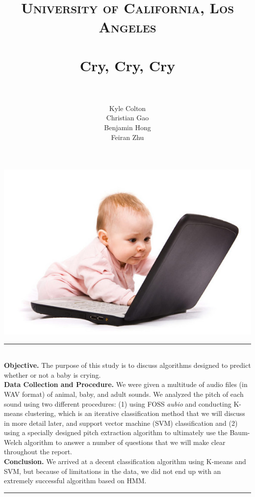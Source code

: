 \documentclass[paper=a4, fontsize=11pt]{scrartcl}
\title{
		\usefont{OT1}{bch}{b}{n}
		\normalfont \normalsize \textsc{University of California, Los Angeles} \\ [25pt]
		\horrule{0.5pt} \\[0.4cm]
		\huge Cry, Cry, Cry \\
		\horrule{2pt} \\[0.5cm]
}
\author{
		\normalfont \normalsize Kyle Colton \\
        \normalfont \normalsize Christian Gao \\
        \normalfont \normalsize  Benjamin Hong \\
        \normalfont \normalsize Feiran Zhu\\
}
\date{}
\numberwithin{equation}{section}
\numberwithin{figure}{section}
\numberwithin{table}{section}
\newcommand{\horrule}[1]{\rule{\linewidth}{#1}}
\begin{document}
\maketitle

\includegraphics[width=\textwidth]{baby.jpg}
\newpage

\tableofcontents
\newpage
\noindent \horrule{0.5pt} 
{\textbf{\\ Objective.}}
The purpose of this study is to discuss algorithms designed to predict whether or not a baby is crying. 
{\textbf{\\ Data Collection and Procedure.}}
We were given a multitude of audio files (in WAV format) of animal, baby, and adult sounds. We analyzed the pitch of each sound using two different procedures: (1) using FOSS \textit{aubio} and conducting K-means clustering, which is an iterative classification method that we will discuss in more detail later, and support vector machine (SVM) classification and (2) using a specially designed pitch extraction algorithm to ultimately use the Baum-Welch algorithm to answer a number of questions that we will make clear throughout the report.
{\textbf{\\ Conclusion.}}
We arrived at a decent classification algorithm using K-means and SVM, but because of limitations in the data, we did not end up with an extremely successful algorithm based on HMM.  \\
\horrule{0.5pt} \\[0.4cm]
%
% 
%
%
% 
%
\end{document}
